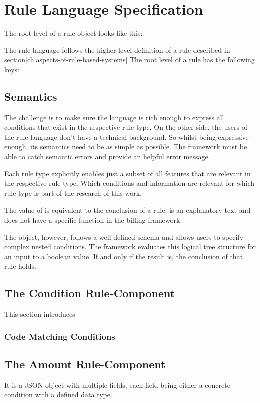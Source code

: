 \section{Rule Language Specification}\label{sec:rule-language-specification}

The root level of a rule object looks like this:

The rule language follows the higher-level definition of a rule described in section\ref{ch:aspects-of-rule-based-systems}
The root level of a rule has the following keys:

\subsection{Semantics}
The challenge is to make sure the language is rich enough
to express all conditions that exist in the respective rule type.
On the other side, the users of the rule language don't have a technical background.
So whilst being expressive enough, its semantics need to be as simple as possible.
The framework must be able to catch semantic errors and provide an helpful error message.

Each rule type explicitly enables just a subset of all features that are relevant in the respective rule type.
Which conditions and information are relevant for which rule type is part of the research of this work.







The value of is equivalent to the conclusion of a rule\cite{abdullah2017performance}.
 is an explanatory text and does not have a specific function in the billing framework.

The object, however, follows a well-defined schema and allows users to specify complex nested conditions.
The framework evaluates this logical tree structure for an input to a boolean value.
If and only if the result is, the conclusion of that rule holds.


\subsection{The Condition Rule-Component}\label{subsec:the-condition-component}

This section introduces


\subsubsection{Code Matching Conditions}


\subsection{The Amount Rule-Component}\label{subsec:the-amount-component}





It is a JSON object with multiple fields, each field being either a concrete condition with a defined data type.



